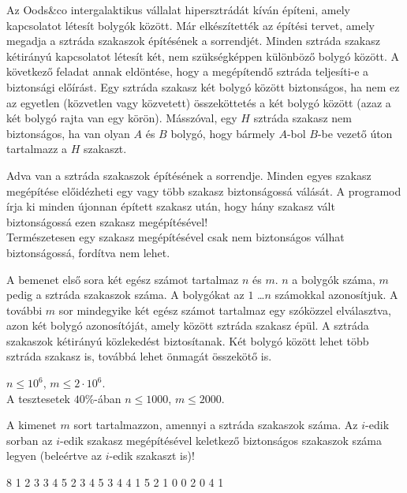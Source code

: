 





Az Oods\&co intergalaktikus vállalat  hipersztrádát kíván építeni,
amely kapcsolatot létesít bolygók között. Már elkészítették az építési tervet, amely megadja a sztráda szakaszok építésének a sorrendjét. Minden sztráda szakasz kétirányú kapcsolatot létesít két, nem szükségképpen különböző bolygó között. A következő feladat annak eldöntése, hogy a megépítendő sztráda teljesíti-e a biztonsági előírást. Egy sztráda szakasz két bolygó között biztonságos, ha nem ez az egyetlen (közvetlen vagy közvetett) összeköttetés a két bolygó között (azaz a két bolygó rajta van egy körön). Másszóval, egy $H$ sztráda szakasz nem biztonságos, ha van olyan $A$ és $B$ bolygó, hogy bármely $A$-bol $B$-be vezető úton tartalmazz a $H$ szakaszt.


Adva van a sztráda szakaszok építésének a sorrendje. Minden egyes szakasz megépítése előidézheti egy vagy több szakasz biztonságossá válását. A programod írja ki minden újonnan épített szakasz után, hogy hány szakasz vált biztonságossá ezen szakasz megépítésével!\\
Természetesen egy szakasz megépítésével csak nem biztonságos válhat biztonságossá, fordítva nem lehet.


A bemenet első sora két egész számot tartalmaz $n$ és $m$.
$n$ a bolygók száma, $m$ pedig a sztráda szakaszok száma.
A bolygókat az $1$ \dots $n$ számokkal azonosítjuk.
A további $m$ sor mindegyike két egész számot tartalmaz egy szóközzel elválasztva, azon két bolygó azonosítóját, amely között sztráda szakasz épül. A sztráda szakaszok kétirányú közlekedést biztosítanak. Két bolygó között lehet több sztráda szakasz is, továbbá lehet önmagát összekötő is.

\smallskip

 $n \leq 10^6$, $m \leq 2\cdot10^6$.\\
A tesztesetek $40\%$-ában $n \leq 1000$, $m \leq 2000$.

A kimenet $m$ sort tartalmazzon, amennyi a sztráda szakaszok száma. Az $i$-edik sorban az $i$-edik szakasz megépítésével keletkező biztonságos szakaszok száma legyen (beleértve az $i$-edik szakaszt is)!



 8
1 2
3 3
4 5
2 3
4 5
3 4
4 1
5 2
1
0
0
2
0
4
1
\sampleEND


 